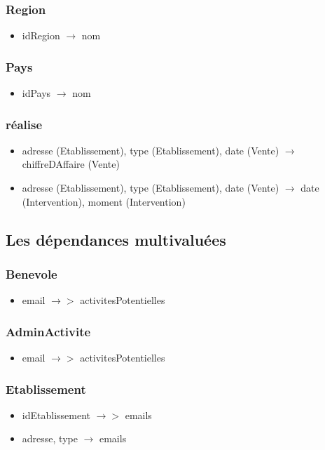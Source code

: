 \subsubsection*{Region}
\begin{itemize}
\item[] idRegion $\rightarrow$ nom
\end{itemize}

\subsubsection*{Pays}
\begin{itemize}
\item[] idPays $\rightarrow$ nom
\end{itemize}
 

\subsubsection*{réalise}
\begin{itemize}
\item[] adresse (Etablissement), type (Etablissement), date (Vente) $\rightarrow$ chiffreDAffaire (Vente)
\item[] adresse (Etablissement), type (Etablissement), date (Vente) $\rightarrow$ date (Intervention), moment (Intervention)
\end{itemize}

\subsection{Les dépendances multivaluées}

\subsubsection*{Benevole}
\begin{itemize}
\item[] email $\rightarrow > $ activitesPotentielles 
\end{itemize}

\subsubsection*{AdminActivite}
\begin{itemize}
\item[]email $\rightarrow >$ activitesPotentielles 
\end{itemize}

\subsubsection*{Etablissement}
\begin{itemize}
\item[] idEtablissement $\rightarrow >$ emails
\item[] adresse, type $\rightarrow$ emails
\end{itemize}

